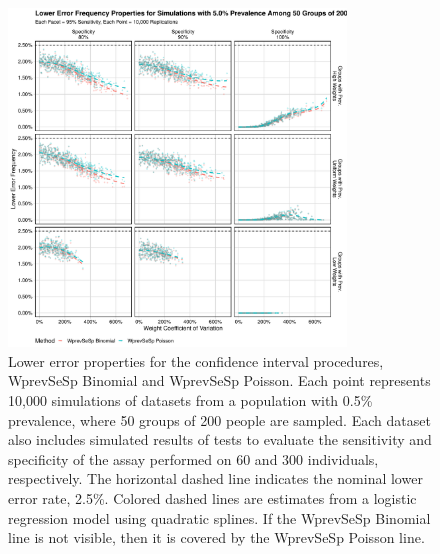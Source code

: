 \begin{figure}
\centering
\includegraphics[width=0.8\textwidth]{imperfect_lower_error_frequency_50_groups_0_05_prev}
\caption{Lower error properties for the confidence interval procedures, WprevSeSp Binomial and WprevSeSp Poisson.
Each point represents 10,000 simulations of datasets from a population with 0.5\% prevalence, where 50 groups of 200 people are sampled.
Each dataset also includes simulated results of tests to evaluate the sensitivity and specificity of the assay performed on 60 and 300 individuals, respectively.
The horizontal dashed line indicates the nominal lower error rate, 2.5\%.
Colored dashed lines are estimates from a logistic regression model using quadratic splines. If the WprevSeSp Binomial line is not visible, then it is covered by the WprevSeSp Poisson line.}
\label{ch_3:fig:imperfect_lower_error_frequency_50_groups_0_05_prev}
\end{figure}

